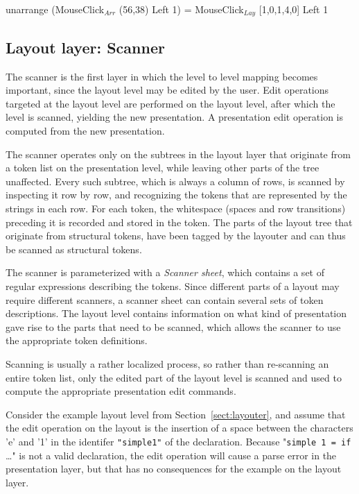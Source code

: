 \ttfamily
unarrange (MouseClick$_{Arr}$ (56,38) Left 1) = MouseClick$_{Lay}$ [1,0,1,4,0] Left 1
\rmfamily


%																
\subsection{Layout layer: Scanner} \label{sect:scanner}

The scanner is the first layer in which the level to level mapping becomes important, since the layout level may be edited by the user. Edit operations targeted at the layout level are performed on the layout level, after which the level is scanned, yielding the new presentation. A presentation edit operation is computed from the new presentation.

The scanner operates only on the subtrees in the layout layer that originate from a token list on the presentation level, while leaving other parts of the tree unaffected. Every such subtree, which is always a column of rows, is scanned by inspecting it row by row, and recognizing the tokens that are represented by the strings in each row. For each token, the whitespace (spaces and row transitions) preceding it is recorded and stored in the token. The parts of the layout tree that originate from structural tokens, have been tagged by the layouter and can thus be scanned as structural tokens. 

The scanner is parameterized with a {\em Scanner sheet}, which contains a set of regular expressions describing the tokens. Since different parts of a layout may require different scanners, a scanner sheet can contain several sets of token descriptions. The layout level contains information on what kind of presentation gave rise to the parts that need to be scanned, which allows the scanner to use the appropriate token definitions.

Scanning is usually a rather localized process, so rather than re-scanning an entire token list, only the edited part of the layout level is scanned and used to compute the appropriate presentation edit commands. 

Consider the example layout level from Section~\ref{sect:layouter}, and assume that the edit operation on the layout is the insertion of a space between the characters 'e' and '1' in the identifer \verb|"simple1"| of the declaration. Because "\verb|simple 1 = if |\dots" is not a valid declaration, the edit operation will cause a parse error in the presentation layer, but that has no consequences for the example on the layout layer.

